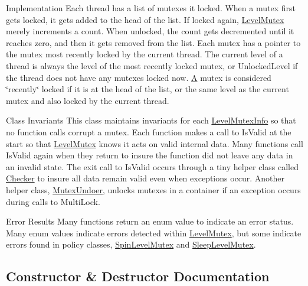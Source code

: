 \begin{DoxyParagraph}{Implementation}
Each thread has a list of mutexes it locked. When a mutex first gets locked, it gets added to the head of the list. If locked again, \hyperlink{classLoki_1_1LevelMutex}{Level\+Mutex} merely increments a count. When unlocked, the count gets decremented until it reaches zero, and then it gets removed from the list. Each mutex has a pointer to the mutex most recently locked by the current thread. The current level of a thread is always the level of the most recently locked mutex, or Unlocked\+Level if the thread does not have any mutexes locked now. \hyperlink{structA}{A} mutex is considered \char`\"{}recently\char`\"{} locked if it is at the head of the list, or the same level as the current mutex and also locked by the current thread.
\end{DoxyParagraph}
\begin{DoxyParagraph}{Class Invariants}
This class maintains invariants for each \hyperlink{classLoki_1_1LevelMutexInfo}{Level\+Mutex\+Info} so that no function calls corrupt a mutex. Each function makes a call to Is\+Valid at the start so that \hyperlink{classLoki_1_1LevelMutex}{Level\+Mutex} knows it acts on valid internal data. Many functions call Is\+Valid again when they return to insure the function did not leave any data in an invalid state. The exit call to Is\+Valid occurs through a tiny helper class called \hyperlink{classLoki_1_1LevelMutexInfo_1_1Checker}{Checker} to insure all data remain valid even when exceptions occur. Another helper class, \hyperlink{classLoki_1_1LevelMutexInfo_1_1MutexUndoer}{Mutex\+Undoer}, unlocks mutexes in a container if an exception occurs during calls to Multi\+Lock.
\end{DoxyParagraph}
\begin{DoxyParagraph}{Error Results}
Many functions return an enum value to indicate an error status. Many enum values indicate errors detected within \hyperlink{classLoki_1_1LevelMutex}{Level\+Mutex}, but some indicate errors found in policy classes, \hyperlink{classLoki_1_1SpinLevelMutex}{Spin\+Level\+Mutex} and \hyperlink{classLoki_1_1SleepLevelMutex}{Sleep\+Level\+Mutex}. 
\end{DoxyParagraph}


\subsection{Constructor \& Destructor Documentation}
\hypertarget{classLoki_1_1LevelMutexInfo_a0e7b01d7e0aad6710f34de9811a88151}{}
